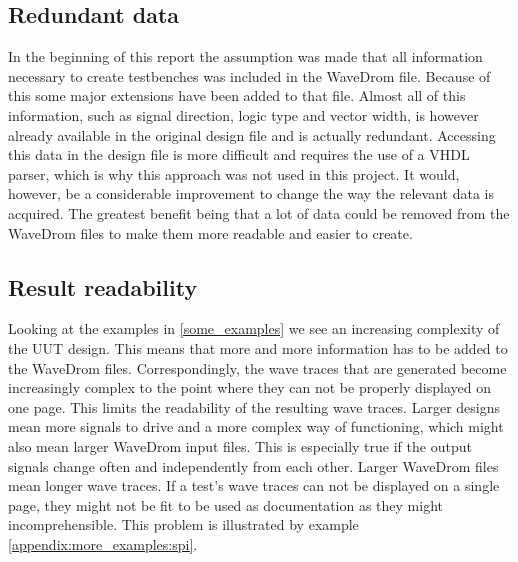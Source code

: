 \subsection{Redundant data}
In the beginning of this report the assumption was made that all information necessary to create testbenches was included in the WaveDrom file. Because of this some major extensions have been added to that file. Almost all of this information, such as signal direction, logic type and vector width, is however already available in the original design file and is actually redundant. Accessing this data in the design file is more difficult and requires the use of a VHDL parser, which is why this approach was not used in this project.
\npar
It would, however, be a considerable improvement to change the way the relevant data is acquired. The greatest benefit being that a lot of data could be removed from the WaveDrom files to make them more readable and easier to create.
\subsection{Result readability}
Looking at the examples in \ref{some_examples} we see an increasing complexity of the UUT design. This means that more and more information has to be added to the WaveDrom files. Correspondingly, the wave traces that are generated become increasingly complex to the point where they can not be properly displayed on one page. This limits the readability of the resulting wave traces. 
\npar
Larger designs mean more signals to drive and a more complex way of functioning, which might also mean larger WaveDrom input files. This is especially true if the output signals change often and independently from each other. Larger WaveDrom files mean longer wave traces.
\npar
If a test's wave traces can not be displayed on a single page, they might not be fit to be used as documentation as they might incomprehensible. This problem is illustrated by example \ref{appendix:more_examples:spi}.\newpage
